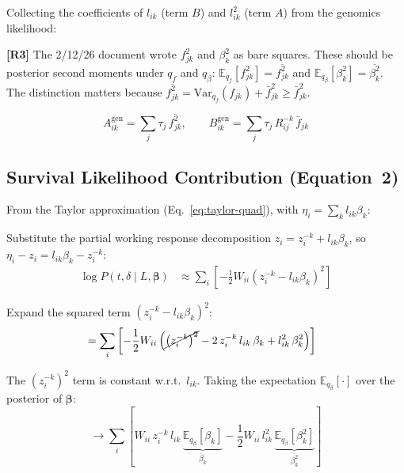 \documentclass[11pt]{article}
\newcommand{\fbar}[2]{\bar{f}_{#1#2}}
\newcommand{\betabar}[1]{\bar{\beta}_{#1}}
\newcommand{\fsec}[2]{\overline{f^2_{#1#2}}}
\newcommand{\betasec}[1]{\overline{\beta^2_{#1}}}
\begin{document}
Collecting the coefficients of $l_{ik}$ (term $B$) and $l_{ik}^2$ (term $A$)
from the genomics likelihood:

\begin{correctionbox}
\textbf{[R3]} The 2/12/26 document wrote $f_{jk}^2$ and $\beta_k^2$ as bare
squares.  These should be posterior second moments under $q_f$ and $q_\beta$:
$\mathbb{E}_{q_f}[f_{jk}^2] = \fsec{j}{k}$ and
$\mathbb{E}_{q_\beta}[\beta_k^2] = \betasec{k}$.  The distinction matters
because $\fsec{j}{k} = \mathrm{Var}_{q_f}(f_{jk}) + \fbar{j}{k}^2 \geq \fbar{j}{k}^2$.
\end{correctionbox}

\begin{equation}\label{eq:genomics-AB}
  A^{\text{gen}}_{ik} = \sum_j \tau_j\,\fsec{j}{k},
  \qquad
  B^{\text{gen}}_{ik} = \sum_j \tau_j\,R^{-k}_{ij}\,\fbar{j}{k}
\end{equation}

\subsection{Survival Likelihood Contribution (Equation~2)}

From the Taylor approximation (Eq.~\eqref{eq:taylor-quad}), with
$\eta_i = \sum_k l_{ik}\beta_k$:

\begin{derivbox}
Substitute the partial working response decomposition
$z_i = z^{-k}_i + l_{ik}\beta_k$, so $\eta_i - z_i = l_{ik}\beta_k - z^{-k}_i$:
\begin{align}
  \log P(t,\delta \mid L,\bm{\beta})
  &\approx \sum_i\left[-\frac{1}{2}W_{ii}\left(z^{-k}_i - l_{ik}\beta_k\right)^2\right]
  \label{eq:surv-lik-1}
\end{align}

Expand the squared term $(z^{-k}_i - l_{ik}\beta_k)^2$:
\begin{align}
  &= \sum_i\left[-\frac{1}{2}W_{ii}
     \left(
       \cancel{\left(z^{-k}_i\right)^2}
       - 2\,z^{-k}_i\,l_{ik}\,\beta_k
       + l_{ik}^2\,\beta_k^2
     \right)\right]
  \label{eq:surv-lik-expand}
\end{align}

The $(z^{-k}_i)^2$ term is constant w.r.t.\ $l_{ik}$.  Taking the expectation
$\mathbb{E}_{q_\beta}[\cdot]$ over the posterior of $\bm{\beta}$:
\begin{equation}
  \longrightarrow \sum_i\left[
    W_{ii}\,z^{-k}_i\,l_{ik}\,\underbrace{\mathbb{E}_{q_\beta}[\beta_k]}_{\betabar{k}}
    - \frac{1}{2}W_{ii}\,l_{ik}^2\,\underbrace{\mathbb{E}_{q_\beta}[\beta_k^2]}_{\betasec{k}}
  \right]
  \label{eq:surv-lik-terms}
\end{equation}
\end{derivbox}
\end{document}
